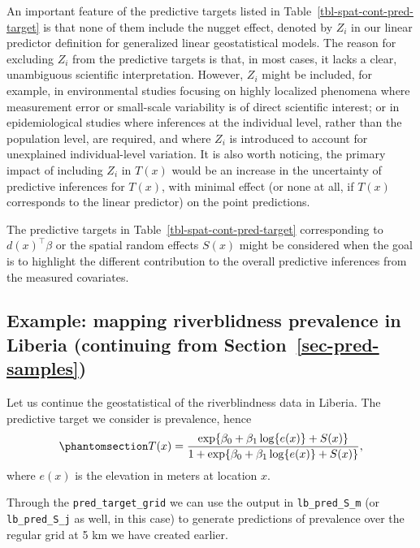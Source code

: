 \documentclass[
  letterpaper,
]{krantz}
\begin{document}
An important feature of the predictive targets listed in
Table~\ref{tbl-spat-cont-pred-target} is that none of them include the
nugget effect, denoted by \(Z_i\) in our linear predictor definition for
generalized linear geostatistical models. The reason for excluding
\(Z_i\) from the predictive targets is that, in most cases, it lacks a
clear, unambiguous scientific interpretation. However, \(Z_i\) might be
included, for example, in environmental studies focusing on highly
localized phenomena where measurement error or small-scale variability
is of direct scientific interest; or in epidemiological studies where
inferences at the individual level, rather than the population level,
are required, and where \(Z_i\) is introduced to account for unexplained
individual-level variation. It is also worth noticing, the primary
impact of including \(Z_i\) in \(T(x)\) would be an increase in the
uncertainty of predictive inferences for \(T(x)\), with minimal effect
(or none at all, if \(T(x)\) corresponds to the linear predictor) on the
point predictions.

The predictive targets in Table~\ref{tbl-spat-cont-pred-target}
corresponding to \(d(x)^\top \beta\) or the spatial random effects
\(S(x)\) might be considered when the goal is to highlight the different
contribution to the overall predictive inferences from the measured
covariates.

\subsection{\texorpdfstring{Example: mapping riverblidness prevalence in
Liberia (continuing from
Section~\ref{sec-pred-samples})}{Example: mapping riverblidness prevalence in Liberia (continuing from Section~)}}\label{sec-liberia-prediction-1}

Let us continue the geostatistical of the riverblindness data in
Liberia. The predictive target we consider is prevalence, hence
\begin{equation}\phantomsection\label{eq-rb-prev-target}{T(x) = \frac{\exp\{ \beta_{0} + \beta_{1}\log\{e(x)\} + S(x)\}}{1+\exp\{\beta_{0} + \beta_{1}\log\{e(x)\} + S(x)\}},}\end{equation}
where \(e(x)\) is the elevation in meters at location \(x\).

Through the \texttt{pred\_target\_grid} we can use the output in
\texttt{lb\_pred\_S\_m} (or \texttt{lb\_pred\_S\_j} as well, in this
case) to generate predictions of prevalence over the regular grid at 5
km we have created earlier.
\end{document}
